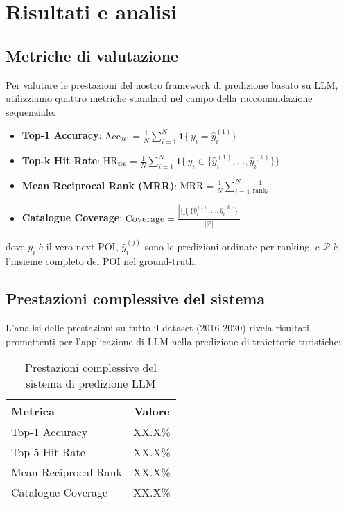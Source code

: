 \section{Risultati e analisi}

\subsection{Metriche di valutazione}

Per valutare le prestazioni del nostro framework di predizione basato su LLM, utilizziamo quattro metriche standard nel campo della raccomandazione sequenziale:

\begin{itemize}
\item \textbf{Top-1 Accuracy}: $\text{Acc}_{@1}=\frac{1}{N}\sum_{i=1}^{N}\mathbf{1}\{\,y_i=\hat{y}_i^{(1)}\}$
\item \textbf{Top-k Hit Rate}: $\text{HR}_{@k}=\frac{1}{N}\sum_{i=1}^{N}\mathbf{1}\{\,y_i\in\{\hat{y}_i^{(1)},\dots,\hat{y}_i^{(k)}\}\}$
\item \textbf{Mean Reciprocal Rank (MRR)}: $\text{MRR}=\frac{1}{N}\sum_{i=1}^{N}\frac{1}{\text{rank}_i}$
\item \textbf{Catalogue Coverage}: $\text{Coverage}=\frac{|\bigcup_{i}\{\hat{y}_i^{(1)},\dots,\hat{y}_i^{(k)}\}|}{|\mathcal{P}|}$
\end{itemize}

dove $y_i$ è il vero next-POI, $\hat{y}_i^{(j)}$ sono le predizioni ordinate per ranking, e $\mathcal{P}$ è l'insieme completo dei POI nel ground-truth.

\subsection{Prestazioni complessive del sistema}

L'analisi delle prestazioni su tutto il dataset (2016-2020) rivela risultati promettenti per l'applicazione di LLM nella predizione di traiettorie turistiche:

\begin{table}[H]
\centering
\caption{Prestazioni complessive del sistema di predizione LLM}
\label{tab:overall_performance}
\begin{tabular}{@{}lc@{}}
\toprule
Metrica & Valore \\
\midrule
Top-1 Accuracy & XX.X\% \\
Top-5 Hit Rate & XX.X\% \\
Mean Reciprocal Rank & XX.X\% \\
Catalogue Coverage & XX.X\% \\
\bottomrule
\end{tabular}
\end{table}


